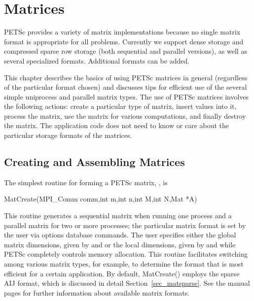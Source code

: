 \chapter{Matrices}
\label{chapter_matrices}

PETSc provides a variety of matrix implementations because no
single matrix format is appropriate for all problems.  Currently we
support dense storage and compressed sparse row storage (both
sequential and parallel versions), as well as several specialized
formats.  Additional formats can be added.

This chapter describes the basics of using PETSc matrices in general
(regardless of the particular format chosen) and discusses tips for
efficient use of the several simple uniprocess and parallel matrix
types.  The use of PETSc matrices involves the following actions:
create a particular type of matrix, insert values into it, process the
matrix, use the matrix for various computations, and finally destroy
the matrix.  The application code does not need to know or care about
the particular storage formats of the matrices.

\section{Creating and Assembling Matrices}
\label{sec_matcreate}

The simplest routine for forming a PETSc matrix, , is 
\begin{tabbing}
  MatCreate(MPI\_Comm comm,int m,int n,int M,int N,Mat *A)
\end{tabbing}
This routine generates a sequential matrix when running one
process and a parallel matrix for two or more processes; the
particular matrix format is set by the user via options database
commands.  The user specifies either the global matrix dimensions, given
by  and  or the local dimensions, given by  and 
 while PETSc completely controls memory allocation.  This routine
facilitates switching among various matrix types, for example, to
determine the format that is most efficient for a certain
application.  By default, MatCreate() employs the sparse AIJ
format, which is discussed in detail Section~\ref{sec_matsparse}.  See
the manual pages for further information about available matrix formats.

